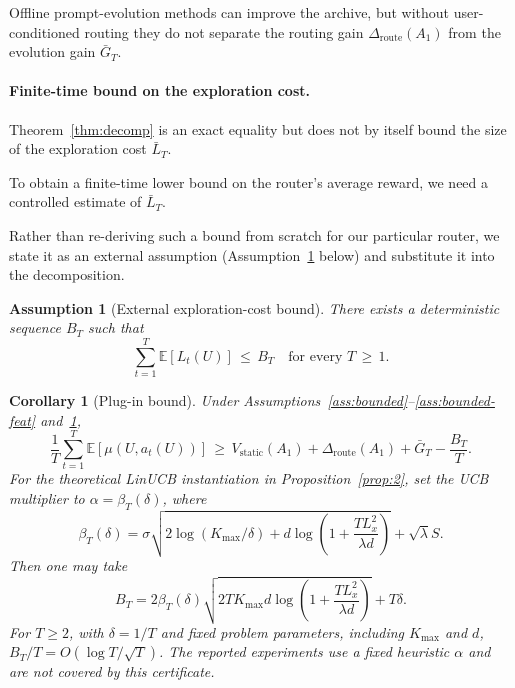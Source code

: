 \documentclass{article} %
\newtheorem{corollary}[theorem]{Corollary}
\newtheorem{assumption}{Assumption}
\providecommand{\E}{\mathbb{E}}
\begin{document}
Offline prompt-evolution methods can improve the archive, but without user-conditioned routing they do not separate the routing gain $\Delta_{\mathrm{route}}(A_1)$ from the evolution gain $\bar G_T$.

\paragraph{Finite-time bound on the exploration cost.}

\label{sec:method-plugin}

Theorem~\ref{thm:decomp} is an exact equality but does not by itself bound the size of the exploration cost $\bar L_T$.

To obtain a finite-time lower bound on the router's average reward, we need a controlled estimate of $\bar L_T$.

Rather than re-deriving such a bound from scratch for our particular router, we state it as an external assumption (Assumption~\ref{ass:Bt} below) and substitute it into the decomposition.

\begin{assumption}[External exploration-cost bound]
\label{ass:Bt}
There exists a deterministic sequence $B_T$ such that
\begin{equation}
\label{eq:ass-Bt}
\sum_{t=1}^T \E[L_t(U)] \,\le\, B_T \quad \text{for every } T \,\ge\, 1.
\end{equation}
\end{assumption}

\begin{corollary}[Plug-in bound]
\label{cor:plugin}
Under Assumptions~\ref{ass:bounded}--\ref{ass:bounded-feat} and~\ref{ass:Bt},
\begin{equation}
\label{eq:cor-plugin}
\frac{1}{T}\sum_{t=1}^T \E[\mu(U, a_t(U))]
\,\ge\, V_{\mathrm{static}}(A_1) + \Delta_{\mathrm{route}}(A_1) + \bar G_T - \frac{B_T}{T}.
\end{equation}
For the theoretical LinUCB instantiation in Proposition~\ref{prop:2}, set the UCB multiplier to $\alpha=\beta_T(\delta)$, where
\begin{equation}
\label{eq:cor-plugin-beta}
\beta_T(\delta)
=
\sigma\sqrt{2\log(K_{\max}/\delta)
+d\log\!\left(1+\frac{TL_x^2}{\lambda d}\right)}
+\sqrt{\lambda}S.
\end{equation}
Then one may take
\begin{equation}
\label{eq:cor-plugin-rate}
B_T
=
2\beta_T(\delta)
\sqrt{2TK_{\max}d
\log\!\left(1+\frac{TL_x^2}{\lambda d}\right)}
+T\delta.
\end{equation}
For \(T\ge2\), with \(\delta=1/T\) and fixed problem parameters, including \(K_{\max}\) and
\(d\), \(B_T/T=O(\log T/\sqrt T)\). The reported experiments use a fixed
heuristic \(\alpha\) and are not covered by this certificate.
\end{corollary}
\end{document}
